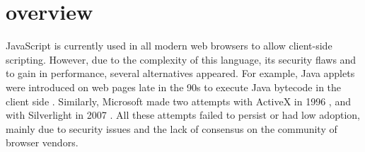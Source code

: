 \section{\wasm overview}
\label{sota:wasm}

\newcommand{\lstnumberautorefname}{Line}
\newcommand{\lineref}[1]{\autoref{#1}}




JavaScript is currently used in all modern web browsers to allow client-side scripting. However, due to the complexity of this language, its security flaws and to gain in performance, several alternatives appeared.  For example, Java applets were introduced on web pages late in the 90s to execute Java bytecode in the client side \cite{javaapplet}. Similarly, Microsoft made two attempts with ActiveX in 1996 \cite{activex}, and with Silverlight in 2007 \cite{silverlight}. All these attempts failed to persist or had low adoption, mainly due to security issues and the lack of consensus on the community of browser vendors.


